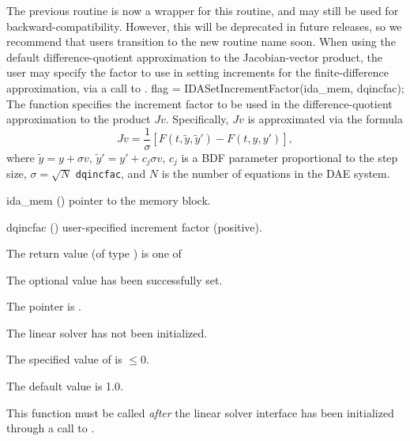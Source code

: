 {{  The previous routine  is now a wrapper for
  this routine, and may still be used for backward-compatibility.
  However, this will be deprecated in future releases, so we recommend
  that users transition to the new routine name soon.
}
When using the default difference-quotient approximation to the Jacobian-vector
product, the user may specify the factor to use in setting increments for the
finite-difference approximation, via a call to .
{
  flag = IDASetIncrementFactor(ida\_mem, dqincfac);
}
{
  The function  specifies the increment
  factor to be used in the difference-quotient approximation to the
  product $Jv$.  Specifically, $Jv$ is approximated via the formula
  \[
    Jv = \frac{1}{\sigma}\left[F(t,\tilde{y},\tilde{y}') - F(t,y,y')\right],
  \]
  where $\tilde{y} = y + \sigma v$,  $\tilde{y}' = y' + c_j \sigma v$,
  $c_j$ is a BDF parameter proportional to the step size, $\sigma
  = \sqrt{N}$ \texttt{dqincfac}, and $N$ is the number of equations in
  the DAE system.
}
{
  \begin{args}[dqincfac]
  \item[ida\_mem] ()
    pointer to the {\ida} memory block.
  \item[dqincfac] ()
    user-specified increment factor (positive).
  \end{args}
}
{
  The return value  (of type ) is one of
  \begin{args}
  \item[\Id{IDALS\_SUCCESS}]
    The optional value has been successfully set.
  \item[\Id{IDALS\_MEM\_NULL}]
    The  pointer is .
  \item[\Id{IDALS\_LMEM\_NULL}]
    The {\idals} linear solver has not been initialized.
  \item[\Id{IDALS\_ILL\_INPUT}]
    The specified value of  is $\le 0$.
  \end{args}
}
{
  The default value is 1.0.

  This function must be called \emph{after} the {\idals} linear solver
  interface has been initialized through a call to
  .

}}
